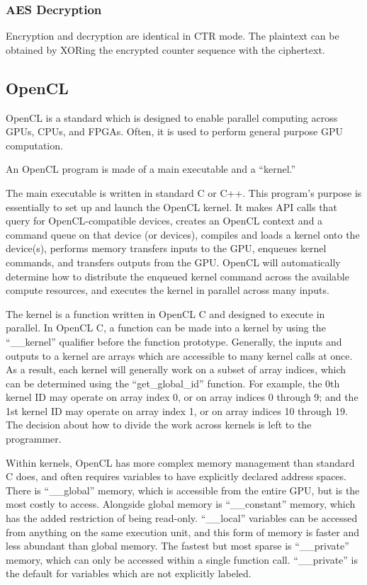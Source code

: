 \documentclass[a4paper,10pt]{article}
\begin{document}
\subsubsection{AES Decryption}

Encryption and decryption are identical in CTR mode.  The plaintext can be obtained by XORing the encrypted counter sequence with the ciphertext.

\subsection{OpenCL}

OpenCL is a standard\cite{khronos} which is designed to enable parallel computing across GPUs, CPUs, and FPGAs.  Often, it is used to perform general purpose GPU computation.

An OpenCL program is made of a main executable and a ``kernel.''

The main executable is written in standard C or C++. This program's purpose is essentially to set up and launch the OpenCL kernel.  It makes API calls that query for OpenCL-compatible devices, creates an OpenCL context and a command queue on that device (or devices), compiles and loads a kernel onto the device(s), performs memory transfers inputs to the GPU, enqueues kernel commands, and transfers outputs from the GPU.  OpenCL will automatically determine how to distribute the enqueued kernel command across the available compute resources, and executes the kernel in parallel across many inputs.  

The kernel is a function written in OpenCL C and designed to execute in parallel.  In OpenCL C, a function can be made into a kernel by using the ``\_\_kernel'' qualifier before the function prototype.  Generally, the inputs and outputs to a kernel are arrays which are accessible to many kernel calls at once.  As a result, each kernel will generally work on a subset of array indices, which can be determined using the ``get\_global\_id'' function. For example, the 0th kernel ID may operate on array index 0, or on array indices 0 through 9; and the 1st kernel ID may operate on array index 1, or on array indices 10 through 19.  The decision about how to divide the work across kernels is left to the programmer.

Within kernels, OpenCL has more complex memory management than standard C does, and often requires variables to have explicitly declared address spaces.  There is ``\_\_global'' memory, which is accessible from the entire GPU, but is the most costly to access.  Alongside global memory is ``\_\_constant'' memory, which has the added restriction of being read-only.  ``\_\_local'' variables can be accessed from anything on the same execution unit, and this form of memory is faster and less abundant than global memory. The fastest but most sparse is ``\_\_private'' memory, which can only be accessed within a single function call.  ``\_\_private'' is the default for variables which are not explicitly labeled.
\end{document}
